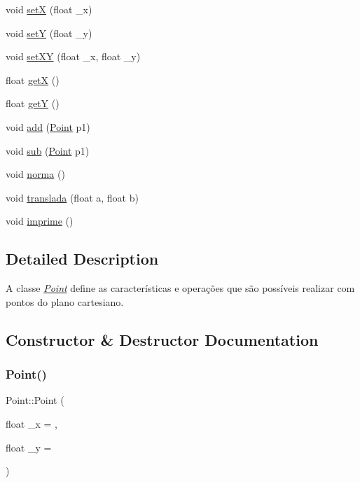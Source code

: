 \begin{DoxyCompactItemize}
void \hyperlink{class_point_a428a1676e2fdec6753c42011a1d59d18}{setX} (float \+\_\+x)
\item 
void \hyperlink{class_point_a9868c4601b0ea0c2d0de20fe41ee0e49}{setY} (float \+\_\+y)
\item 
void \hyperlink{class_point_ab5385c6d9bfa841e641e4709fc9f14cc}{set\+XY} (float \+\_\+x, float \+\_\+y)
\item 
float \hyperlink{class_point_acc27466778cc87a662bba40268c4c0c8}{getX} ()
\item 
float \hyperlink{class_point_a3cccbca94719ddde353cce86ce0e2f64}{getY} ()
\item 
void \hyperlink{class_point_a6bcf8fd2524ecc4d5b6c1dc942d541a5}{add} (\hyperlink{class_point}{Point} p1)
\item 
void \hyperlink{class_point_af7d9e533f0030edf4ab28fdc0f12acd4}{sub} (\hyperlink{class_point}{Point} p1)
\item 
void \hyperlink{class_point_a6233714649b03294a020827fb53eb8ad}{norma} ()
\item 
void \hyperlink{class_point_ad9676e36f3444534b609e3c68422239a}{translada} (float a, float b)
\item 
void \hyperlink{class_point_a1fb5c2501c27ab2cbc99d06c2a26a741}{imprime} ()
\end{DoxyCompactItemize}


\subsection{Detailed Description}
A classe {\itshape \hyperlink{class_point}{Point}} define as características e operações que são possíveis realizar com pontos do plano cartesiano. 

\subsection{Constructor \& Destructor Documentation}
\mbox{\label{class_point_a06c32166c2ad9eac25799ef189b49683}} 
\subsubsection{\texorpdfstring{Point()}{Point()}}
{\footnotesize\ttfamily Point\+::\+Point (\begin{DoxyParamCaption}\item[{float}]{\+\_\+x = {},  }\item[{float}]{\+\_\+y = {} }\end{DoxyParamCaption})}



